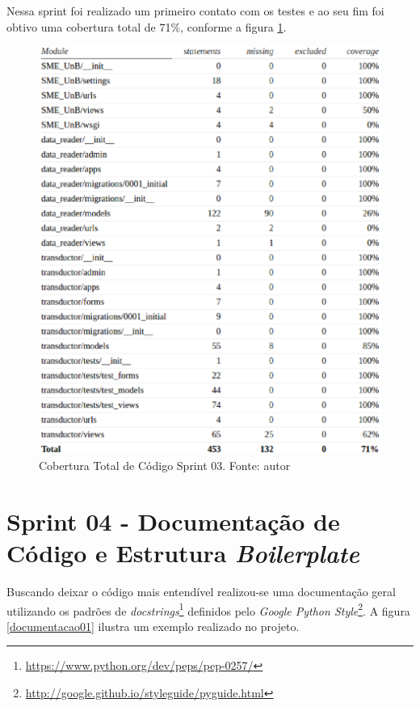 \vfill
\pagebreak

Nessa sprint foi realizado um primeiro contato com os testes e ao seu fim foi obtivo uma cobertura total de 71\%, conforme a figura \ref{cobertura01}.

\begin{figure}[!htpb]
    \centering
    \includegraphics[keepaspectratio=true,scale=0.5]{figuras/cobertura01.eps}
    \caption{Cobertura Total de Código Sprint 03. Fonte: autor}
    \label{cobertura01}
\end{figure}

\section{Sprint 04 - Documentação de Código e Estrutura \textit{Boilerplate}}
Buscando deixar o código mais entendível realizou-se uma documentação geral utilizando os padrões de \textit{docstrings}\footnote{\url{https://www.python.org/dev/peps/pep-0257/}} definidos pelo \textit{Google Python Style}\footnote{\url{http://google.github.io/styleguide/pyguide.html}}. A figura \ref{documentacao01} ilustra um exemplo realizado no projeto.

